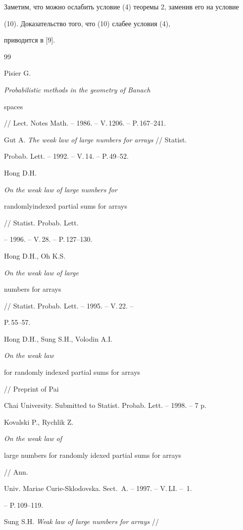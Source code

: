 Заметим, что можно ослабить условие (4) теоремы 2, заменив его на условие 


(10). Доказательство того, что (10) слабее условия (4),


приводится в [9].





\begin{thebibliography}{99}







Pisier G. {\em Probabilistic methods in the geometry of Banach


spaces} // Lect. Notes Math. -- 1986. -- V.\,1206. -- P.\,167--241.




Gut A. {\em The weak law of large numbers for arrays} // Statist.


Probab. Lett. -- 1992. -- V.\,14. -- P.\,49--52.




Hong D.H. {\em On the weak law of large numbers for


randomlyindexed partial sums for arrays} // Statist. Probab. Lett. 


-- 1996. -- V.\,28. -- P.\,127--130.




Hong D.H., Oh K.S. {\em On the weak law of large


numbers for arrays} // Statist. Probab. Lett. -- 1995. -- V.\,22. --


P.\,55--57.




Hong D.H., Sung S.H., Volodin A.I. {\em On the weak law


for randomly indexed partial sums for arrays} // Preprint of Pai


Chai University. Submitted to Statist. Probab. Lett. -- 1998. -- 7 p.




Kovalski P., Rychlik Z. {\em On the weak law of


large numbers for randomly idexed partial sums for arrays} // Ann.


Univ. Mariae Curie-Sklodovska. Sect.~A. -- 1997. -- V.\,LI. -- \No\,1.


-- P.\,109--119.




Sung S.H. {\em Weak law of large numbers for arrays} //



\end{thebibliography}

